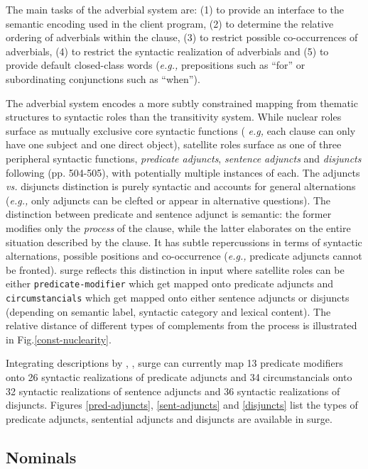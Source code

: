 The main tasks of the adverbial system are: (1) to provide an interface to
the semantic encoding used in the client program, (2) to determine the
relative ordering of adverbials within the clause, (3) to restrict possible
co-occurrences of adverbials, (4) to restrict the syntactic realization of
adverbials and (5) to provide default closed-class words ({\em e.g.,}
prepositions such as ``for'' or subordinating conjunctions such as
``when'').

The adverbial system encodes a more subtly constrained mapping from
thematic structures to syntactic roles than the transitivity system. While
nuclear roles surface as mutually exclusive core syntactic functions ({\em
  e.g,} each clause can only have one subject and one direct object),
satellite roles surface as one of three peripheral syntactic functions,
{\em predicate adjuncts}, {\em sentence adjuncts} and {\em disjuncts}
following \cite{quirk-et-al85} (pp. 504-505), with potentially multiple
instances of each. The adjuncts {\em vs.} disjuncts distinction is purely
syntactic and accounts for general alternations ({\em e.g.,} only adjuncts
can be clefted or appear in alternative questions). The distinction between
predicate and sentence adjunct is semantic: the former modifies only the
{\em process} of the clause, while the latter elaborates on the entire
situation described by the clause.  It has subtle repercussions in terms of
syntactic alternations, possible positions and co-occurrence ({\em e.g.,}
predicate adjuncts cannot be fronted). {\sc surge} reflects this distinction
in input where satellite roles can be either {\tt predicate-modifier} which
get mapped onto predicate adjuncts and {\tt circumstancials} which get
mapped onto either sentence adjuncts or disjuncts (depending on semantic
label, syntactic category and lexical content).  The relative distance of
different types of complements from the process is illustrated in
Fig.\ref{const-nuclearity}.

Integrating descriptions by \cite{quirk-et-al85}, \cite{thompson-longacre}
\cite{halliday94}, {\sc surge} can currently map 13 predicate modifiers
onto 26 syntactic realizations of predicate adjuncts and 34 circumstancials
onto 32 syntactic realizations of sentence adjuncts and 36 syntactic
realizations of disjuncts.  Figures \ref{pred-adjuncts},
\ref{sent-adjuncts} and \ref{disjuncts} list the types of predicate
adjuncts, sentential adjuncts and disjuncts are available in {\sc surge}.


\subsection{Nominals} 


